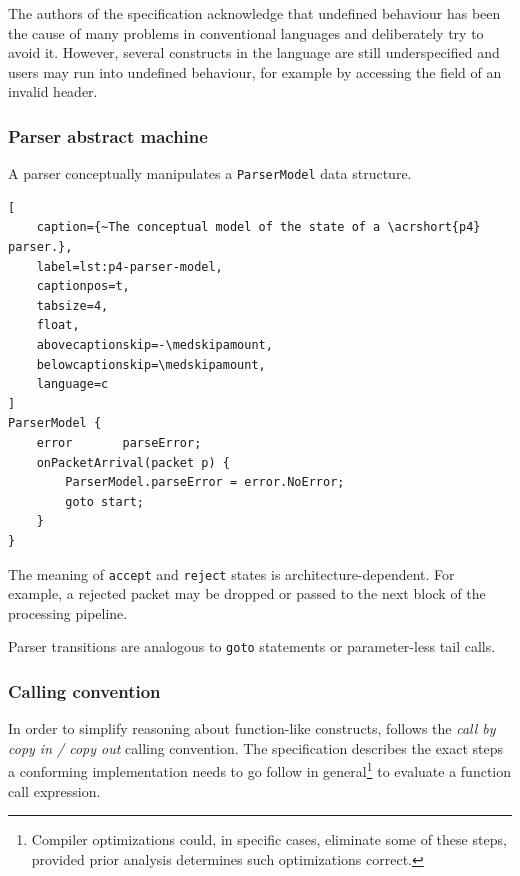 The authors of the specification acknowledge that undefined behaviour has been
the cause of many problems in conventional languages and deliberately try to
avoid it. However, several constructs in the language are still underspecified
and users may run into undefined behaviour, for example by accessing the field
of an invalid header.


\subsubsection*{Parser abstract machine}

A parser conceptually manipulates a \texttt{ParserModel} data structure.

\begin{lstlisting}[
	caption={~The conceptual model of the state of a \acrshort{p4} parser.},
	label=lst:p4-parser-model,
	captionpos=t,
	tabsize=4,
	float,
	abovecaptionskip=-\medskipamount,
	belowcaptionskip=\medskipamount,
	language=c
]
ParserModel {
	error       parseError;
	onPacketArrival(packet p) {
		ParserModel.parseError = error.NoError;
		goto start;
	}
}
\end{lstlisting}

The meaning of \texttt{accept} and \texttt{reject} states is
architecture-dependent. For example, a rejected packet may be dropped or
passed to the next block of the processing pipeline.

Parser transitions are analogous to \texttt{goto} statements or parameter-less
tail calls.

\subsubsection*{Calling convention}

In order to simplify reasoning about function-like constructs, \pfs follows the
\emph{call by copy in / copy out} calling convention. The specification
describes the exact steps a conforming implementation needs to go follow in
general\footnote{Compiler optimizations could, in specific cases, eliminate some
of these steps, provided prior analysis determines such optimizations correct.}
to evaluate a function call expression.

